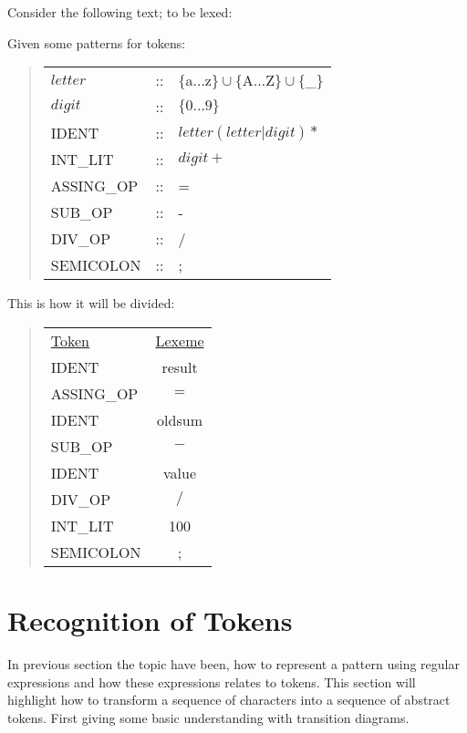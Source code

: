 \begin{example} \label{codeToToken}$ $\\
Consider the following text; to be lexed:
\begin{quote}

\end{quote}
Given some patterns for tokens:
\begin{quote}
\begin{tabular}{l c l}
$letter$ & :: & $\{$a$ \dots $z$\} \cup \{$A$ \dots $Z$\} \cup \{$\_$\}$\\
$digit$ & :: & $\{0 \dots 9\}$\\
IDENT & :: & $letter(letter|digit)*$\\
INT\_LIT & :: & $digit+$\\
ASSING\_OP & :: & =\\
SUB\_OP & :: & -\\
DIV\_OP & :: & /\\
SEMICOLON & :: & ;
\end{tabular}
\end{quote}

This is how it will be divided:
\begin{quote}
\begin{tabular}{l c}
\underline{Token} & \underline{Lexeme}\\
IDENT & result\\
ASSING\_OP & $=$\\
IDENT & oldsum\\
SUB\_OP & $-$\\
IDENT & value\\
DIV\_OP & $/$\\
INT\_LIT & 100\\
SEMICOLON & ;
\end{tabular}
\end{quote}
\end{example}

\section{Recognition of Tokens}
In previous section the topic have been, how to represent a pattern using 
regular expressions and how these expressions relates to tokens. This section 
will highlight how to transform a sequence of characters into a sequence of 
abstract tokens. First giving some basic understanding with transition diagrams.  

